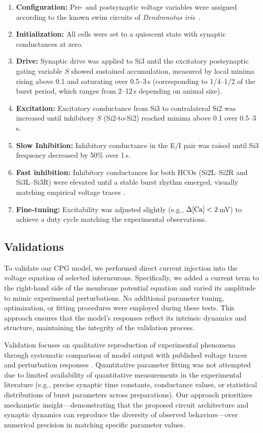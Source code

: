 \documentclass[nofootinbib,aip,amsmath,amssymb,preprint,twocolumn,floatfix,10pt]{revtex4-2}
\begin{document}
\begin{enumerate}
  \item \textbf{Configuration:} Pre- and postsynaptic voltage variables were assigned according to the known swim circuits of \textit{Dendronotus iris}~\cite{SakuraiKatz2016}.
  \item \textbf{Initialization:} All cells were set to a quiescent state with synaptic conductances at zero.
  \item \textbf{Drive:} Synaptic drive was applied to Si3 until the excitatory postsynaptic gating variable $S$ showed sustained accumulation, measured by local minima rising above 0.1 and saturating over 0.5--3\,s (corresponding to 1/4--1/2 of the burst period, which ranges from 2--12\,s depending on animal size).
  \item \textbf{Excitation:} Excitatory conductance from Si3 to contralateral Si2 was increased until inhibitory $S$ (Si2-to-Si2) reached minima above 0.1 over 0.5--3\,s.
  \item \textbf{Slow Inhibition:} Inhibitory conductance in the E/I pair was raised until Si3 frequency decreased by 50\% over 1\,s.
  \item \textbf{Fast inhibition:} Inhibitory conductances for both HCOs (Si2L--Si2R and Si3L--Si3R) were elevated until a stable burst rhythm emerged, visually matching empirical voltage traces \cite{SakuraiKatz2016}.
  \item \textbf{Fine-tuning:} Excitability was adjusted slightly (e.g., $\Delta [\rm Ca] < 2$\,mV) to achieve a duty cycle matching the experimental observations.
\end{enumerate}

\subsection{Validations}
%
To validate our CPG model, we performed direct current injection into the voltage equation of selected interneurons. Specifically, we added a current term to the right-hand side of the membrane potential equation and varied its amplitude to mimic experimental perturbations. No additional parameter tuning, optimization, or fitting procedures were employed during these tests. This approach ensures that the model's responses reflect its intrinsic dynamics and structure, maintaining the integrity of the validation process.

Validation focuses on qualitative reproduction of experimental phenomena through systematic comparison of model output with published voltage traces and perturbation responses \cite{SakuraiKatz2016, sakurai2019command, sakurai2022bursting}. Quantitative parameter fitting was not attempted due to limited availability of quantitative measurements in the experimental literature (e.g., precise synaptic time constants, conductance values, or statistical distributions of burst parameters across preparations). Our approach prioritizes mechanistic insight---demonstrating that the proposed circuit architecture and synaptic dynamics can reproduce the diversity of observed behaviors---over numerical precision in matching specific parameter values.
\end{document}
